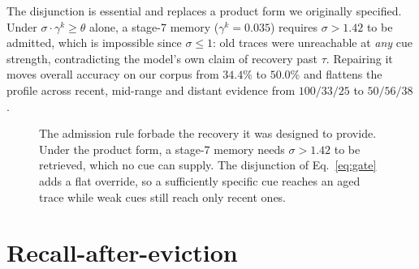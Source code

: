 \documentclass{article}
\theoremstyle{definition}\newtheorem{remark}{Remark}
\theoremstyle{plain}\newtheorem{proposition}{Proposition}
\begin{document}
The disjunction is essential and replaces a product form we originally
specified. Under $\sigma\cdot\gamma^{k}\ge\theta$ alone, a stage-7 memory
($\gamma^{k}=0.035$) requires $\sigma>1.42$ to be admitted, which is impossible
since $\sigma\le1$: old traces were unreachable at \emph{any} cue strength,
contradicting the model's own claim of recovery past $\tau$. Repairing it moves overall accuracy on our corpus from $34.4\%$ to $50.0\%$
and flattens the profile across recent, mid-range and distant evidence from
$100/33/25$ to $50/56/38$.


\begin{figure}[t]
\centering
{}
\caption{The admission rule forbade the recovery it was designed to provide.
Under the product form, a stage-7 memory needs $\sigma>1.42$ to be retrieved,
which no cue can supply. The disjunction of Eq.~\eqref{eq:gate} adds a flat
override, so a sufficiently specific cue reaches an aged trace while weak cues
still reach only recent ones.}
\label{fig:gate}
\end{figure}

\section{Recall-after-eviction}
\label{sec:protocol}
\end{document}
